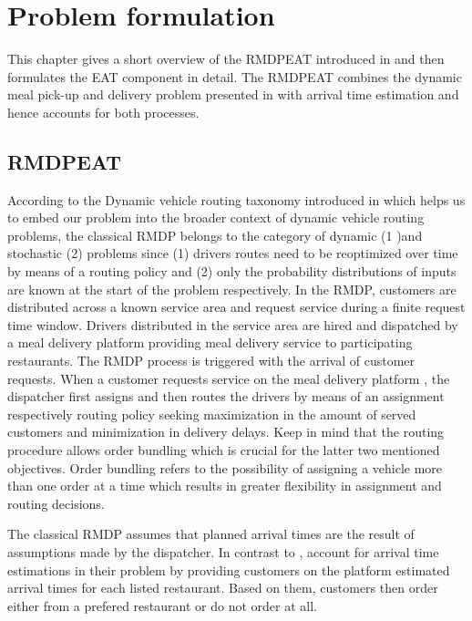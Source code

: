 \chapter{Problem formulation}

This chapter gives a short overview of the RMDPEAT introduced in \cite{Hildebrandt2020_EAT} and then formulates the EAT component in detail. The RMDPEAT combines the dynamic meal pick-up and delivery problem presented in \cite{UlmerRMDP} with arrival time estimation and hence accounts for both processes.  

\section{RMDPEAT} 

According to the Dynamic vehicle routing taxonomy introduced in \cite{psaraftis} which helps us to embed our problem into the broader context of dynamic vehicle routing problems, the classical RMDP belongs to the category of dynamic (1 )and stochastic (2) problems since (1) drivers routes need to be reoptimized over time by means of a routing policy and (2) only the probability distributions of inputs are known at the start of the problem respectively. In the RMDP, customers are distributed across a known service area and request service during a finite request time window. Drivers distributed in the service area are hired and dispatched by a meal delivery platform providing meal delivery service to participating restaurants. The RMDP process is triggered with the arrival of customer requests. When a customer requests service on the meal delivery platform , the dispatcher first assigns and then routes the drivers by means of an assignment respectively routing policy seeking maximization in the amount of served customers and minimization in delivery delays. Keep in mind that the routing procedure allows order bundling which is crucial for the latter two mentioned objectives. Order bundling refers to the possibility of assigning a vehicle more than one order at a time which results in greater flexibility in assignment and routing decisions.

The classical RMDP assumes that planned arrival times are the result of assumptions made by the dispatcher. In contrast to \citet{UlmerRMDP}, \citet{Hildebrandt2020_EAT} account for arrival time estimations in their problem by providing customers on the platform estimated arrival times for each listed restaurant. Based on them, customers then order either from a prefered restaurant or do not order at all.
  
